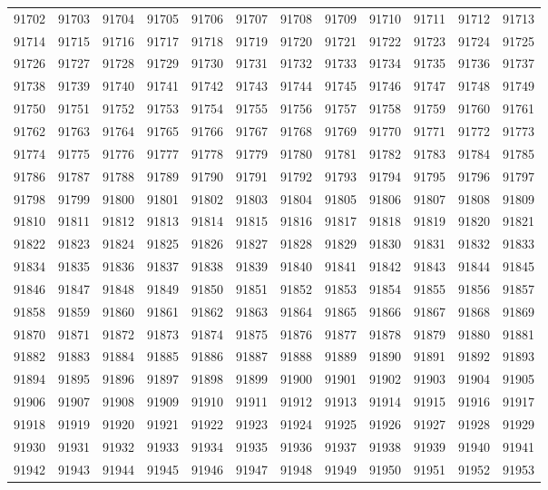\begin{center}
\begin{longtable}{llllllllllll}
91702 &91703 &91704 &91705 &91706 &91707 &91708 &91709 &91710 &91711 &91712 &91713 \\
91714 &91715 &91716 &91717 &91718 &91719 &91720 &91721 &91722 &91723 &91724 &91725 \\
91726 &91727 &91728 &91729 &91730 &91731 &91732 &91733 &91734 &91735 &91736 &91737 \\
91738 &91739 &91740 &91741 &91742 &91743 &91744 &91745 &91746 &91747 &91748 &91749 \\
91750 &91751 &91752 &91753 &91754 &91755 &91756 &91757 &91758 &91759 &91760 &91761 \\
91762 &91763 &91764 &91765 &91766 &91767 &91768 &91769 &91770 &91771 &91772 &91773 \\
91774 &91775 &91776 &91777 &91778 &91779 &91780 &91781 &91782 &91783 &91784 &91785 \\
91786 &91787 &91788 &91789 &91790 &91791 &91792 &91793 &91794 &91795 &91796 &91797 \\
91798 &91799 &91800 &91801 &91802 &91803 &91804 &91805 &91806 &91807 &91808 &91809 \\
91810 &91811 &91812 &91813 &91814 &91815 &91816 &91817 &91818 &91819 &91820 &91821 \\
91822 &91823 &91824 &91825 &91826 &91827 &91828 &91829 &91830 &91831 &91832 &91833 \\
91834 &91835 &91836 &91837 &91838 &91839 &91840 &91841 &91842 &91843 &91844 &91845 \\
91846 &91847 &91848 &91849 &91850 &91851 &91852 &91853 &91854 &91855 &91856 &91857 \\
91858 &91859 &91860 &91861 &91862 &91863 &91864 &91865 &91866 &91867 &91868 &91869 \\
91870 &91871 &91872 &91873 &91874 &91875 &91876 &91877 &91878 &91879 &91880 &91881 \\
91882 &91883 &91884 &91885 &91886 &91887 &91888 &91889 &91890 &91891 &91892 &91893 \\
91894 &91895 &91896 &91897 &91898 &91899 &91900 &91901 &91902 &91903 &91904 &91905 \\
91906 &91907 &91908 &91909 &91910 &91911 &91912 &91913 &91914 &91915 &91916 &91917 \\
91918 &91919 &91920 &91921 &91922 &91923 &91924 &91925 &91926 &91927 &91928 &91929 \\
91930 &91931 &91932 &91933 &91934 &91935 &91936 &91937 &91938 &91939 &91940 &91941 \\
91942 &91943 &91944 &91945 &91946 &91947 &91948 &91949 &91950 &91951 &91952 &91953 \\

\end{longtable}
\end{center}
